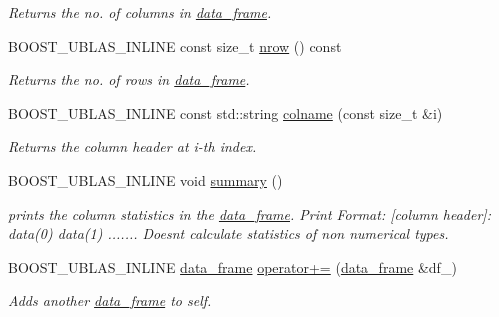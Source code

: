 \begin{DoxyCompactItemize}
\begin{DoxyCompactList}\small\item\em Returns the no. of columns in \hyperlink{classboost_1_1numeric_1_1ublas_1_1data__frame}{data\+\_\+frame}. \end{DoxyCompactList}\item 
B\+O\+O\+S\+T\+\_\+\+U\+B\+L\+A\+S\+\_\+\+I\+N\+L\+I\+NE const size\+\_\+t \hyperlink{classboost_1_1numeric_1_1ublas_1_1data__frame_a7f773294cbd41d890b5469e2a85abd32}{nrow} () const 
\begin{DoxyCompactList}\small\item\em Returns the no. of rows in \hyperlink{classboost_1_1numeric_1_1ublas_1_1data__frame}{data\+\_\+frame}. \end{DoxyCompactList}\item 
B\+O\+O\+S\+T\+\_\+\+U\+B\+L\+A\+S\+\_\+\+I\+N\+L\+I\+NE const std\+::string \hyperlink{classboost_1_1numeric_1_1ublas_1_1data__frame_abda7571a20f64b31d627d3fb2f7956fb}{colname} (const size\+\_\+t \&i)
\begin{DoxyCompactList}\small\item\em Returns the column header at i-\/th index. \end{DoxyCompactList}\item 
B\+O\+O\+S\+T\+\_\+\+U\+B\+L\+A\+S\+\_\+\+I\+N\+L\+I\+NE void \hyperlink{classboost_1_1numeric_1_1ublas_1_1data__frame_a9d94261a11a013b3bcf883dec199e6fd}{summary} ()
\begin{DoxyCompactList}\small\item\em prints the column statistics in the \hyperlink{classboost_1_1numeric_1_1ublas_1_1data__frame}{data\+\_\+frame}. Print Format\+: \mbox{[}column header\mbox{]}\+: data(0) data(1) ....... Doesn\textquotesingle{}t calculate statistics of non numerical types. \end{DoxyCompactList}\item 
B\+O\+O\+S\+T\+\_\+\+U\+B\+L\+A\+S\+\_\+\+I\+N\+L\+I\+NE \hyperlink{classboost_1_1numeric_1_1ublas_1_1data__frame}{data\+\_\+frame} \hyperlink{classboost_1_1numeric_1_1ublas_1_1data__frame_aab98eadd961b57bf5030c6fe14e38a81}{operator+=} (\hyperlink{classboost_1_1numeric_1_1ublas_1_1data__frame}{data\+\_\+frame} \&df\+\_\+)
\begin{DoxyCompactList}\small\item\em Adds another \hyperlink{classboost_1_1numeric_1_1ublas_1_1data__frame}{data\+\_\+frame} to self. \end{DoxyCompactList}\item 

\end{DoxyCompactItemize}

